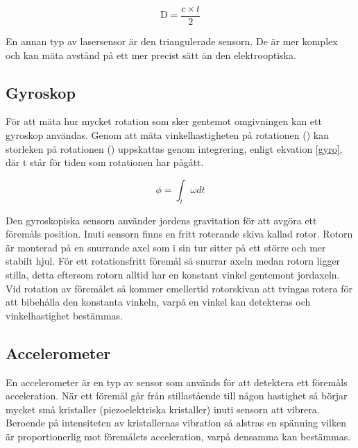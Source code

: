 \documentclass[11pt]{article}
\begin{document}
\begin{flushleft}
\begin{equation}\label{laser_eq}
	\textrm{D} = \frac {c \times t}{2}						
\end{equation}

En annan typ av lasersensor är den triangulerade sensorn. De är mer komplex och kan mäta avstånd på ett mer precist sätt än den elektrooptiska. \cite{website:mti}

\subsection{Gyroskop}
För att mäta hur mycket rotation som sker gentemot omgivningen kan ett gyroskop användas. Genom att mäta vinkelhastigheten på rotationen (\textomega) kan storleken på rotationen (\straightphi) uppskattas genom integrering, enligt ekvation \ref{gyro}, där t står för tiden som rotationen har pågått. \cite{Gyroscope}

\begin{equation}\label{gyro}
	\phi = \int_{t}^{ }\omega dt 						
\end{equation}

Den gyroskopiska sensorn använder jordens gravitation för att avgöra ett föremåls position. Inuti sensorn finns en fritt roterande skiva kallad rotor. Rotorn är monterad på en snurrande axel som i sin tur sitter på ett större och mer stabilt hjul. För ett rotationsfritt föremål så snurrar axeln medan rotorn ligger stilla, detta eftersom rotorn alltid har en konstant vinkel gentemont jordaxeln. Vid rotation av föremålet så kommer emellertid rotorskivan att tvingas rotera för att bibehålla den konstanta vinkeln, varpå en vinkel kan detekteras och vinkelhastighet bestämmas. \cite{Gyro}

\subsection{Accelerometer}
En accelerometer är en typ av sensor som används för att detektera ett föremåls acceleration. När ett föremål går från stillastående till någon hastighet så börjar mycket små kristaller (piezoelektriska kristaller) inuti sensorn att vibrera. Beroende på intensiteten av kristallernas vibration så alstras en spänning vilken är proportionerlig mot föremålets acceleration, varpå densamma kan bestämmas. \cite{Accelerometer}





\end{flushleft}
\end{document}
